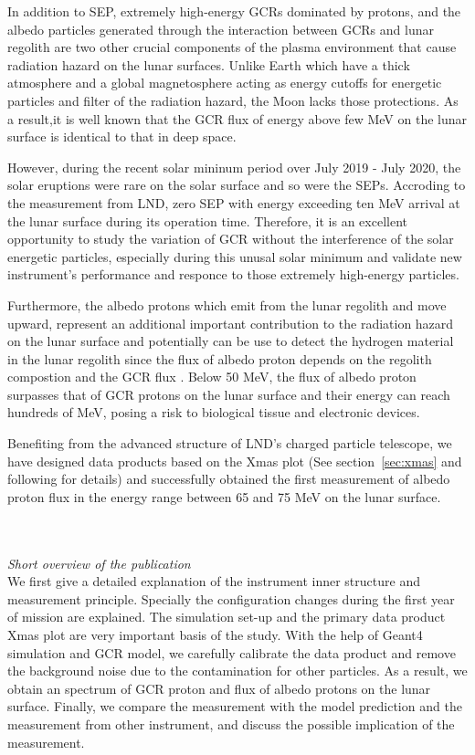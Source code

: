 
In addition to \acs{SEP}, extremely high-energy \acp{GCR} dominated by protons, and the albedo particles generated through the interaction between \acp{GCR} and lunar regolith are two other crucial components of the plasma environment that cause radiation hazard on the lunar surfaces.
Unlike Earth which have a thick atmosphere and a global magnetosphere acting as energy cutoffs for energetic particles and filter of the radiation hazard, the Moon lacks those protections. As a result,it is well known that the \ac{GCR} flux of energy above few MeV on the lunar surface is identical to that in deep space.


However, during the recent solar mininum period over July 2019 - July 2020, the solar eruptions were rare on the solar surface and so were the \acp{SEP}. Accroding to the measurement from \ac{LND}, zero \ac{SEP} with energy exceeding ten MeV arrival at the lunar surface during its operation time.
Therefore, it is an excellent opportunity to study the variation of \acs{GCR} without the interference of the solar energetic particles, especially during this unusal solar minimum \citep{Strauss2023ApJ, Fu2021ApJS} and validate new instrument's performance and responce to those extremely high-energy particles.    

Furthermore, the albedo protons which emit from the lunar regolith and move upward, represent an additional important contribution to the radiation hazard on the lunar surface and potentially can be use to detect the hydrogen material in the lunar regolith since the flux of albedo proton depends on the regolith compostion and the \ac{GCR} flux \citep{Schwadron2016Icarus}.
Below 50 MeV, the flux of albedo proton surpasses that of GCR protons on the lunar surface \citep{Dobynde2021JGRE, Wimmer2020SSRv} and their energy can reach hundreds of MeV, posing a risk to biological tissue and electronic devices.

Benefiting from the advanced structure of \ac{LND}'s charged particle telescope, we have designed data products based on the Xmas plot (See section~\ref{sec:xmas} and following for details) and successfully obtained the first measurement of albedo proton flux in the energy range between 65 and 75 MeV on the lunar surface.

\\
\\
\textit{Short overview of the publication}\\

We first give a detailed explanation of the instrument inner structure and measurement principle. Specially the configuration changes during the first year of mission are explained. The simulation set-up and the primary data product Xmas plot are very important basis of the study.
With the help of \ac{Geant4} simulation and \ac{GCR} model, we carefully calibrate the data product and remove the background noise due to the contamination for other particles. As a result, we obtain an spectrum of \ac{GCR} proton and flux of albedo protons on the lunar surface. Finally, we compare the measurement with the model prediction and the measurement from other instrument, and discuss the possible implication of the measurement.


